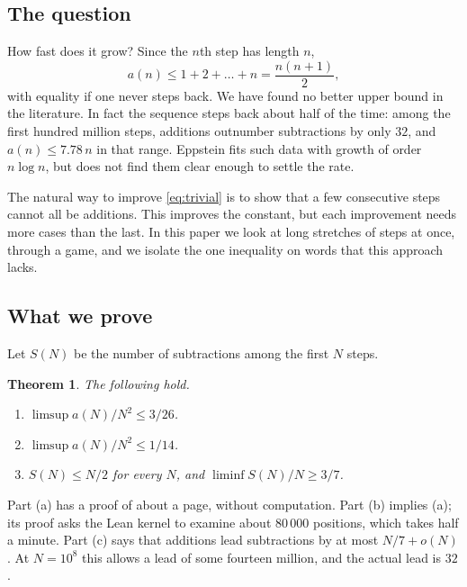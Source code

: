 \documentclass[11pt]{amsart}
\newtheorem{theorem}{Theorem}[section]
\theoremstyle{definition}
\begin{document}
\subsection{The question}
How fast does it grow? Since the $n$th step has length $n$,
\begin{equation}\label{eq:trivial}
  a(n)\le 1+2+\dots+n=\frac{n(n+1)}2 ,
\end{equation}
with equality if one never steps back. We have found no better upper bound in the literature. In fact the sequence steps back
about half of the time: among the first hundred million steps, additions outnumber subtractions by only $32$, and $a(n)\le7.78\,n$
in that range. Eppstein \cite{Eppstein2019} fits such data with growth of order $n\log n$, but does not find them clear enough to
settle the rate.

The natural way to improve \eqref{eq:trivial} is to show that a few consecutive steps cannot all be additions. This improves the
constant, but each improvement needs more cases than the last. In this paper we look at long stretches of steps at once, through a
game, and we isolate the one inequality on words that this approach lacks.

\subsection{What we prove}
Let $S(N)$ be the number of subtractions among the first $N$ steps.

\begin{theorem}\label{thm:main}
The following hold.
\begin{enumerate}[label=\textup{(\alph*)}]
  \item $\limsup a(N)/N^2\le 3/26$.
  \item $\limsup a(N)/N^2\le 1/14$.
  \item $S(N)\le N/2$ for every $N$, and $\liminf S(N)/N\ge 3/7$.
\end{enumerate}
\end{theorem}

Part (a) has a proof of about a page, without computation. Part (b) implies (a); its proof asks the Lean kernel to examine
about $80\,000$ positions, which takes half a minute. Part (c) says that additions lead subtractions by at most $N/7+o(N)$. At
$N=10^8$ this allows a lead of some fourteen million, and the actual lead is $32$.
\end{document}
